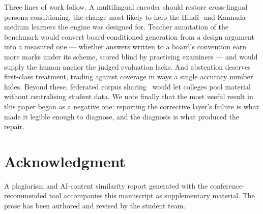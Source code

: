 \documentclass[conference]{IEEEtran}
\begin{document}
Three lines of work follow. A multilingual encoder should restore cross-lingual
persona conditioning, the change most likely to help the Hindi- and
Kannada-medium learners the engine was designed for. Teacher annotation of the
benchmark would convert board-conditioned generation from a design argument into
a measured one --- whether answers written to a board's convention earn more
marks under its scheme, scored blind by practising examiners --- and would
supply the human anchor the judged evaluation lacks. And abstention deserves
first-class treatment, trading against coverage in ways a single accuracy number
hides. Beyond these, federated corpus sharing~\cite{fajardo2025} would let
colleges pool material without centralising student data. We note finally that
the most useful result in this paper began as a negative one: reporting the
corrective layer's failure is what made it legible enough to diagnose, and the
diagnosis is what produced the repair.

\section*{Acknowledgment}
A plagiarism and AI-content similarity report generated with the
conference-recommended tool accompanies this manuscript as supplementary
material. The prose has been authored and revised by the student team.
\end{document}
